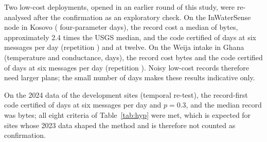 Two low-cost deployments, opened in an earlier round of this study, were re-analysed after the confirmation as an exploratory check. On the InWaterSense node in Kosovo \citep{ahmedi2022} (\inwsDays{} four-parameter days), the record cost a median of \inwsMedBytes{} bytes, approximately 2.4 times the USGS median, and the code certified \inwsCodeSix{} of days at six messages per day (repetition \inwsRepSix{}) and \inwsCodeTwelve{} at twelve. On the Weija intake in Ghana \citep{adumanu2020} (temperature and conductance, \weijaDays{} days), the record cost \weijaMedBytes{} bytes and the code certified \weijaCodeSix{} of days at six messages per day (repetition \weijaRepSix{}). Noisy low-cost records therefore need larger plans; the small number of days makes these results indicative only.

On the 2024 data of the development sites (temporal re-test), the record-first code certified \gCodeIidRetest{} of days at six messages per day and $p = 0.3$, and the median record was \needMedRetest{} bytes; all eight criteria of Table~\ref{tab:hyp} were met, which is expected for sites whose 2023 data shaped the method and is therefore not counted as confirmation.
